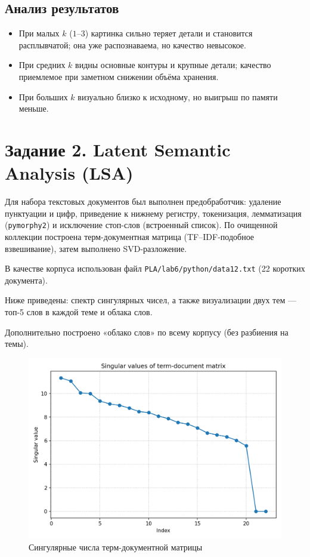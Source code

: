 \subsection*{Анализ результатов}
\begin{itemize}
  \item При малых \(k\) (\(1\)–\(3\)) картинка сильно теряет детали и становится расплывчатой; она уже распознаваема, но качество невысокое.
  \item При средних \(k\) видны основные контуры и крупные детали; качество приемлемое при заметном снижении объёма хранения.
  \item При больших \(k\) визуально близко к исходному, но выигрыш по памяти меньше.
\end{itemize}

\section*{Задание 2. Latent Semantic Analysis (LSA)}

Для набора текстовых документов был выполнен предобработчик: удаление пунктуации и цифр, приведение к нижнему регистру, токенизация, лемматизация (\texttt{pymorphy2}) и исключение стоп-слов (встроенный список). По очищенной коллекции построена терм-документная матрица (TF–IDF-подобное взвешивание), затем выполнено SVD-разложение.

В качестве корпуса использован файл \texttt{PLA/lab6/python/data12.txt} (22 коротких документа).

Ниже приведены: спектр сингулярных чисел, а также визуализации двух тем — топ-5 слов в каждой теме и облака слов.

Дополнительно построено «облако слов» по всему корпусу (без разбиения на темы).

\begin{figure}[h!]
  \centering
  \includegraphics[width=0.6\linewidth]{images/task2/singular_values.png}
  \caption{Сингулярные числа терм-документной матрицы}
  \label{fig:lsa-svals}
\end{figure}

